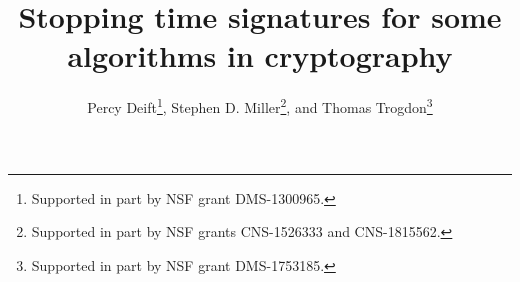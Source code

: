 \documentclass{llncs}
\numberwithin{equation}{section}
\renewcommand\({\left(}
\renewcommand\){\right)}
\begin{document}
\title{\vspace{-1in} Stopping time signatures for some algorithms in cryptography}
\author{Percy Deift\thanks{Supported in part by NSF grant DMS-1300965.}, Stephen D. Miller\thanks{Supported in part by NSF grants CNS-1526333 and CNS-1815562.}, and Thomas Trogdon\thanks{Supported in part by NSF grant DMS-1753185.}}









\maketitle
\end{document}
